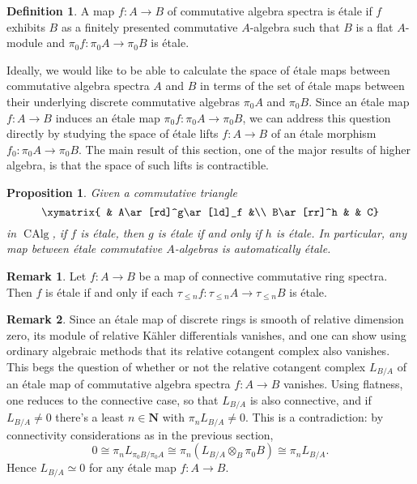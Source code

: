 \documentclass[12pt]{article}
\newtheorem{proposition}{Proposition}[subsection]
\theoremstyle{definition}
\newtheorem{definition}{Definition}[subsection]
\newtheorem{remark}{Remark}[subsection]
\newcommand{\NN}{\mathbf{N}}
\DeclareMathOperator{\CAlg}{CAlg}
\begin{document}
\begin{definition}
A map $f:A\to B$ of commutative algebra spectra is {\'etale}
if $f$ exhibits $B$ as a finitely presented commutative $A$-algebra such that $B$ is a flat $A$-module and $\pi_0 f:\pi_0 A\to\pi_0 B$ is \'etale.
\end{definition}

Ideally, we would like to be able to calculate the space of \'etale maps between commutative algebra spectra $A$ and $B$ in terms of the set of \'etale maps between their underlying discrete commutative algebras $\pi_0 A$ and $\pi_0 B$.
Since an \'etale map $f:A\to B$ induces an \'etale map $\pi_0 f:\pi_0 A\to\pi_0 B$, we can address this question directly by studying the space of \'etale lifts $f:A\to B$ of an \'etale morphism $f_0:\pi_0 A\to\pi_0 B$.
The main result of this section, one of the major results of higher algebra, is that the space of such lifts is contractible.

\begin{proposition}{\em \cite[Remark 7.5.1.7]{HA}}\label{prop:mbemie}
Given a commutative triangle
\[
\xymatrix{
& A\ar[rd]^g\ar[ld]_f &\\
B\ar[rr]^h & & C}
\]
 in $\CAlg$, if $f$ is \'etale, then $g$ is \'etale if and only if $h$ is \'etale.
 In particular, any map between \'etale commutative $A$-algebras is automatically \'etale.
\end{proposition}

\begin{remark} Let $f : A\to B$ be a map of connective commutative ring spectra. Then $f$ is \'etale if and only if each  $\tau_{\leq n}f:\tau_{\leq n} A\to\tau_{\leq n} B$ is \'etale.
\end{remark}

\begin{remark}
Since an \'etale map of discrete rings is smooth of relative dimension zero, its module of relative K\"ahler differentials vanishes, and one can show using ordinary algebraic methods that its relative cotangent complex also vanishes.
This begs the question of whether or not the relative cotangent complex $L_{B/A}$ of an \'etale map of commutative algebra spectra $f:A\to B$ vanishes.
Using flatness, one reduces to the connective case, so that $L_{B/A}$ is also connective, and if $L_{B/A}\neq 0$  there's a least $n\in\NN$ with $\pi_n L_{B/A}\neq 0$.
This is a contradiction: by connectivity considerations as in the previous section, 
\[
0\cong\pi_n L_{\pi_0 B/\pi_0 A}\cong\pi_n(L_{B/A}\otimes_B\pi_0 B)\cong\pi_n L_{B/A}.
\]
Hence $L_{B/A}\simeq 0$ for any \'etale map $f:A\to B$.
\end{remark}
\end{document}
